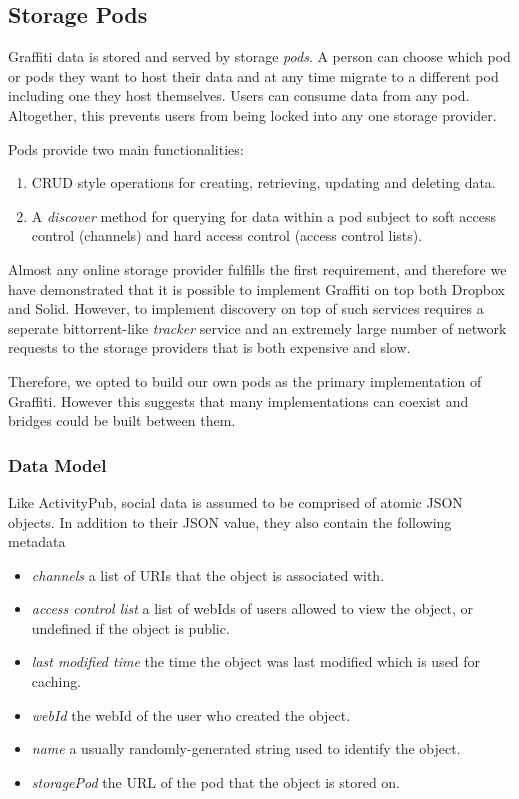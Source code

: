\subsection{Storage Pods}
\label{storage-pods}

Graffiti data is stored and served by storage \emph{pods}.
A person can choose which pod or pods they want to host their data
and at any time migrate to a different pod including one they host themselves.
Users can consume data from any pod.
Altogether, this prevents users from being locked into any one storage provider.

Pods provide two main functionalities:
\begin{enumerate}
\item CRUD style operations for creating, retrieving, updating and deleting data.
\item A \emph{discover} method for querying for data within a pod subject to soft access control (channels)
and hard access control (access control lists).
\end{enumerate}

Almost any online storage provider fulfills the first requirement,
and therefore we have demonstrated that it is possible to implement Graffiti on top both Dropbox and Solid.
However, to implement discovery on top of such services requires a seperate
bittorrent-like \emph{tracker} service and an extremely large number of network requests
to the storage providers that is both expensive and slow.

Therefore, we opted to build our own pods as the primary implementation of Graffiti.
However this suggests that many implementations can coexist and bridges
could be built between them.

\subsubsection{Data Model}

Like ActivityPub, social data is assumed to be comprised of atomic JSON objects.
In addition to their JSON value, they also contain the following metadata
\begin{itemize}
\item \emph{channels} a list of URIs that the object is associated with.
\item \emph{access control list} a list of webIds of users allowed to view the object, or undefined if the object is public.
\item \emph{last modified time} the time the object was last modified which is used for caching.
\item \emph{webId} the webId of the user who created the object.
\item \emph{name} a usually randomly-generated string used to identify the object.
\item \emph{storagePod} the URL of the pod that the object is stored on.
\end{itemize}


